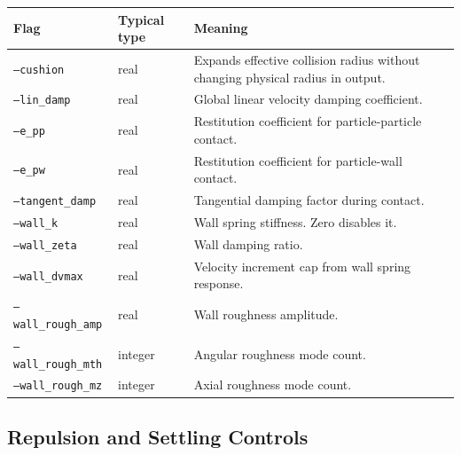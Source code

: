 \documentclass[11pt]{article}
\begin{document}
\begin{longtable}{p{}p{}p{}}
\toprule
\textbf{Flag} & \textbf{Typical type} & \textbf{Meaning} \\
\midrule
\endhead
\texttt{--cushion} & real & Expands effective collision radius without changing physical radius in output. \\
\texttt{--lin\_damp} & real & Global linear velocity damping coefficient. \\
\texttt{--e\_pp} & real & Restitution coefficient for particle-particle contact. \\
\texttt{--e\_pw} & real & Restitution coefficient for particle-wall contact. \\
\texttt{--tangent\_damp} & real & Tangential damping factor during contact. \\
\texttt{--wall\_k} & real & Wall spring stiffness. Zero disables it. \\
\texttt{--wall\_zeta} & real & Wall damping ratio. \\
\texttt{--wall\_dvmax} & real & Velocity increment cap from wall spring response. \\
\texttt{--wall\_rough\_amp} & real & Wall roughness amplitude. \\
\texttt{--wall\_rough\_mth} & integer & Angular roughness mode count. \\
\texttt{--wall\_rough\_mz} & integer & Axial roughness mode count. \\
\bottomrule
\end{longtable}

\subsection{Repulsion and Settling Controls}
\end{document}
